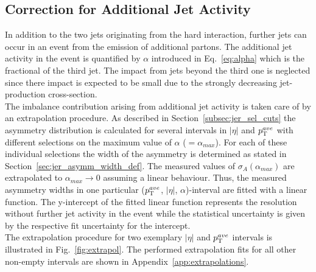 \subsection{Correction for Additional Jet Activity}
\label{subsec:jer_corrections_alpha}
In addition to the two jets originating from the hard interaction, further jets can occur in an event from the emission of additional partons. The additional jet activity in the event is quantified by $\alpha$ introduced in Eq.~\ref{eq:alpha} which is the fractional \pt of the third jet. The impact from jets beyond the third one is neglected since there impact is expected to be small due to the strongly decreasing jet-production cross-section. \\
The imbalance contribution arising from additional jet activity is taken care of by an extrapolation procedure. As described in Section~\ref{subsec:jer_sel_cuts} the asymmetry distribution is calculated for several intervals in $|\eta|$ and $p_{\text{T}}^{ave}$ with different selections on the maximum value of $\alpha$ ($=\alpha_{max}$). For each of these individual selections the width of the asymmetry is determined as stated in Section~\ref{sec:jer_asymm_width_def}. The measured values of $\sigma_{A}(\alpha_{max})$ are extrapolated to $\alpha_{max} \rightarrow 0$ assuming a linear behaviour. Thus, the measured asymmetry widths in one particular ($p_{\text{T}}^{ave}$, $|\eta|$, $\alpha$)-interval are fitted with a linear function. The y-intercept of the fitted linear function represents the resolution without further jet activity in the event while the statistical uncertainty is given by the respective fit uncertainty for the intercept. \\
The extrapolation procedure for two exemplary $|\eta|$ and $p_{\text{T}}^{ave}$ intervals is illustrated in Fig.~\ref{fig:extrapol}. The performed extrapolation fits for all other non-empty intervals are shown in Appendix~\ref{app:extrapolations}. \\
